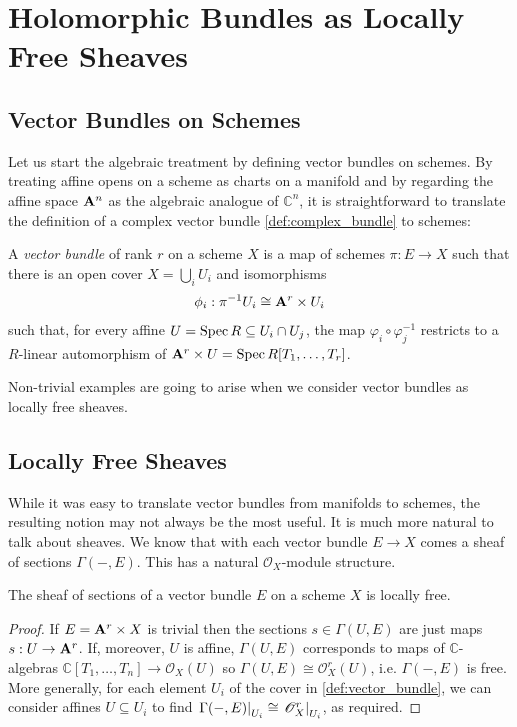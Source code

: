 \documentclass[12pt]{ociamthesis}  %
\begin{document}
\section{Holomorphic Bundles as Locally Free Sheaves}

\missingsection

\subsection{Vector Bundles on Schemes}

Let us start the algebraic treatment by defining vector bundles on
schemes. By treating affine opens on a scheme as charts on a manifold
and by regarding the affine space $\mathbf{A}^{n}_{}$ as the algebraic
analogue of $\mathbb C^n$, it is straightforward to translate
the definition of a complex vector bundle \ref{def:complex_bundle}
to schemes:

\begin{definition}
  \label{def:vector_bundle}
  A \emph{vector bundle} of rank $r$ on a scheme $X$ is
  a map of schemes $\pi : E \to X$ such that there is an open
  cover $X = \bigcup_i U_i$ and isomorphisms
  \begin{align}\label{eq:trivialisation}
    \phi_i : {\pi}^{-1}U_i \cong \mathbf{A}^{r}_{}\times U_i
  \end{align}
  such that, for every affine $U = \operatorname{Spec} R \subseteq U_i \cap U_j$,
  the map $\varphi_i \circ \varphi^{-1}_j$ restricts to a $R$-linear
  automorphism of $\mathbf{A}^{r}_{}\times U = \operatorname{Spec} R[T_1,\ldots,T_r]$.
\end{definition}

Non-trivial examples are going to arise when we consider vector bundles
as locally free sheaves.

\subsection{Locally Free Sheaves}\label{sec:locally_free_sheaves}

While it was easy to translate vector bundles from manifolds
to schemes, the resulting notion may not always be the most
useful. It is much more natural to talk about sheaves. We know
that with each vector bundle $E\to X$ comes a sheaf of sections
$\Gamma(-,E)$. This has a natural $\mathscr O_X$-module structure.

\begin{lemma}
  The sheaf of sections of a vector bundle $E$ on a scheme $X$ is
  locally free.
  \begin{proof}
    If $E=\mathbf{A}^{r}_{}\times X$ is
    trivial then the sections $s\in\Gamma(U,E)$ are just maps
    $s:U\to \mathbf{A}^{r}_{}$. If, moreover, $U$ is affine,
    $\Gamma(U,E)$ corresponds to maps of
    $\mathbb{C}$-algebras
    $\mathbb{C}[T_1,\ldots,T_n]\to\mathscr O_X(U)$ so
    $\Gamma(U,E)\cong \mathscr O^r_X(U)$, i.e. $\Gamma(-,E)$
    is free.
    More generally, for each element $U_i$ of the cover in
    \ref{def:vector_bundle}, we can consider affines $U\subseteq U_i$
    to find $\left.{\Gamma(-,E)}\right\vert_{U_i}\cong \left.{\mathscr O_X^r}\right\vert_{U_i}$,
    as required.
  \end{proof}
\end{lemma}
\end{document}
